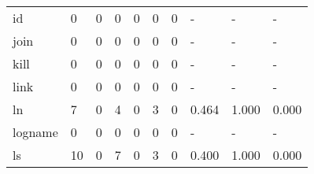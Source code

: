 \begin{longtable}{lp{2.0cm}p{2.0cm}p{2.0cm}p{2.0cm}p{2.0cm}p{2.0cm}p{2.0cm}p{2.0cm}p{2.0cm}}
id        &                      0 &                                  0 &                                 0 &                                0 &                                 0 &                               0 &                                    - &                                      - &                                    - \\
join      &                      0 &                                  0 &                                 0 &                                0 &                                 0 &                               0 &                                    - &                                      - &                                    - \\
kill      &                      0 &                                  0 &                                 0 &                                0 &                                 0 &                               0 &                                    - &                                      - &                                    - \\
link      &                      0 &                                  0 &                                 0 &                                0 &                                 0 &                               0 &                                    - &                                      - &                                    - \\
ln        &                      7 &                                  0 &                                 4 &                                0 &                                 3 &                               0 &                                0.464 &                                  1.000 &                                0.000 \\
logname   &                      0 &                                  0 &                                 0 &                                0 &                                 0 &                               0 &                                    - &                                      - &                                    - \\
ls        &                     10 &                                  0 &                                 7 &                                0 &                                 3 &                               0 &                                0.400 &                                  1.000 &                                0.000 \\

\end{longtable}
